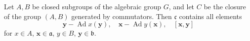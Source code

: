 Let $A, B$ be closed subgroups of the algebraic group $G$, and let $C$ be the closure of the group $(A, B)$ generated by commutators. Then $\mathfrak{c}$ contains all elements
$$\mathbf{y} - \operatorname{Ad} x(\mathbf{y}), \quad \mathbf{x} - \operatorname{Ad} y(\mathbf{x}), \quad [\mathbf{x}, \mathbf{y}]$$
for $x \in A$, $\mathbf{x} \in \mathfrak{a}$, $y \in B$, $\mathbf{y} \in \mathfrak{b}$.
